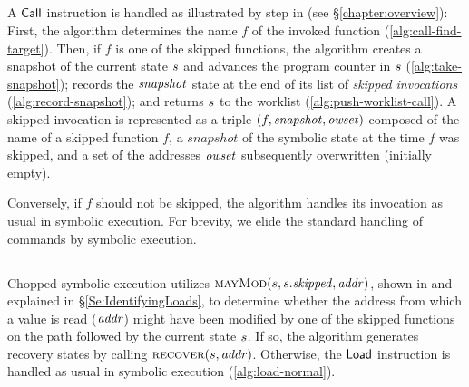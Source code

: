 \subsection{}

A $\mathsf{Call}$ instruction is handled as illustrated by step
 in  (see \S\ref{chapter:overview}): First, the
algorithm determines the name $f$ of the invoked function
(\cref{alg:call-find-target}). Then, if $f$ is one of the skipped
functions, the algorithm creates a snapshot of the current state
$s$ and advances the program counter in $s$
(\cref{alg:take-snapshot}); records the $\mathit{snapshot}$ state at the end
of its list of \emph{skipped invocations}
(\cref{alg:record-snapshot}); and returns $s$ to the worklist
(\cref{alg:push-worklist-call}). A skipped invocation is represented
as a triple $(f,\mathit{snapshot},\mathit{owset})$ composed of the name of a skipped
function $f$, a $snapshot$ of the symbolic state at the time $f$ was
skipped, and a set of the addresses $\mathit{owset}$ subsequently overwritten
(initially empty).

Conversely, if $f$ should not be skipped, the algorithm handles its
invocation as usual in symbolic execution.  For brevity, we elide the
standard handling of commands by symbolic execution.

\subsection{}

Chopped symbolic execution utilizes
$\Call{mayMod}{\workstate,\workstate.\skipped,\addr}$, shown in
 and explained in
\S\ref{Se:IdentifyingLoads}, to determine whether the address from
which a value is read ($\mathit{addr}$) might have been modified by one of the
skipped functions on the path followed by the current state
$s$. If so, the algorithm generates recovery states by
calling $\Call{recover}{\workstate,\addr}$.  Otherwise, the
$\mathsf{Load}$ instruction is handled as usual in symbolic
execution (\cref{alg:load-normal}).

